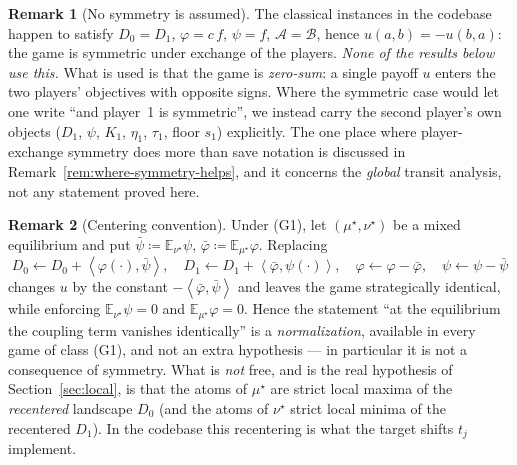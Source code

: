 \documentclass[11pt]{article}
\theoremstyle{definition}
\newtheorem{remark}{Remark}
\newcommand{\E}{\mathbb{E}}
\newcommand{\cA}{\mathcal{A}}
\newcommand{\cB}{\mathcal{B}}
\newcommand{\ip}[2]{\left\langle #1, #2 \right\rangle}
\begin{document}
\begin{remark}[No symmetry is assumed]\label{rem:asym}
The classical instances in the codebase happen to satisfy $D_0 = D_1$,
$\varphi = c\,f$, $\psi = f$, $\cA = \cB$, hence $u(a,b) = -u(b,a)$: the game
is symmetric under exchange of the players. \emph{None of the results below use
this.} What is used is that the game is \emph{zero-sum}: a single payoff $u$
enters the two players' objectives with opposite signs. Where the symmetric
case would let one write ``and player~1 is symmetric'', we instead carry the
second player's own objects ($D_1$, $\psi$, $K_1$, $\eta_1$, $\tau_1$, floor
$s_1$) explicitly. The one place where player-exchange symmetry does more than
save notation is discussed in Remark~\ref{rem:where-symmetry-helps}, and it
concerns the \emph{global} transit analysis, not any statement proved here.
\end{remark}

\begin{remark}[Centering convention]\label{rem:centering}
Under (G1), let $(\mu^\star, \nu^\star)$ be a mixed equilibrium and put
$\bar\psi \coloneqq \E_{\nu^\star} \psi$, $\bar\varphi \coloneqq
\E_{\mu^\star} \varphi$. Replacing
\[
  D_0 \leftarrow D_0 + \ip{\varphi(\cdot)}{\bar\psi}, \quad
  D_1 \leftarrow D_1 + \ip{\bar\varphi}{\psi(\cdot)}, \quad
  \varphi \leftarrow \varphi - \bar\varphi, \quad
  \psi \leftarrow \psi - \bar\psi
\]
changes $u$ by the constant $-\ip{\bar\varphi}{\bar\psi}$ and leaves the game
strategically identical, while enforcing
$\E_{\nu^\star}\psi = 0$ and $\E_{\mu^\star}\varphi = 0$. Hence the statement
``at the equilibrium the coupling term vanishes identically'' is a
\emph{normalization}, available in every game of class (G1), and not an extra
hypothesis --- in particular it is not a consequence of symmetry. What is
\emph{not} free, and is the real hypothesis of Section~\ref{sec:local}, is that
the atoms of $\mu^\star$ are strict local maxima of the \emph{recentered}
landscape $D_0$ (and the atoms of $\nu^\star$ strict local minima of the
recentered $D_1$). In the codebase this recentering is what the target shifts
$t_j$ implement.
\end{remark}
\end{document}

